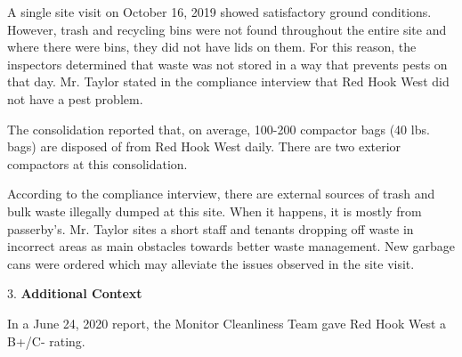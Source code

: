 A single site visit on October 16, 2019 showed satisfactory ground conditions. However, trash and recycling bins were not found throughout the entire site and where there were bins, they did not have lids on them. For this reason, the inspectors determined that waste was not stored in a way that prevents pests on that day. Mr. Taylor stated in the compliance interview that Red Hook West did not have a pest problem.

The consolidation reported that, on average, 100-200 compactor bags (40 lbs. bags) are disposed of from Red Hook West daily. There are two exterior compactors at this consolidation. 

According to the compliance interview, there are external sources of trash and bulk waste illegally dumped at this site. When it happens, it is mostly from passerby's. Mr. Taylor sites a short staff and tenants dropping off waste in incorrect areas as main obstacles towards better waste management. New garbage cans were ordered which may alleviate the issues observed in the site visit.

3. \textbf{Additional Context} 

In a June 24, 2020 report, the Monitor Cleanliness Team gave Red Hook West a B+/C- rating. 